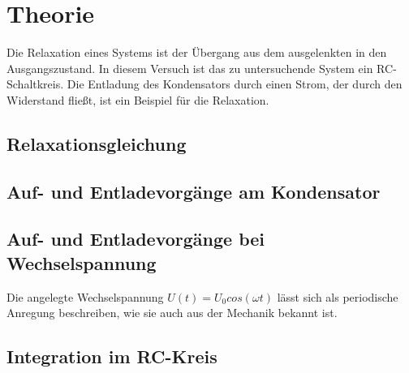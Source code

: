 \section{Theorie}
\label{sec:Theorie}

Die Relaxation eines Systems ist der Übergang aus dem ausgelenkten in den Ausgangszustand.
In diesem Versuch ist das zu untersuchende System ein RC-Schaltkreis.
Die Entladung des Kondensators durch einen Strom, der durch den Widerstand fließt, 
ist ein Beispiel für die Relaxation.

\subsection{Relaxationsgleichung}
\label{subsec:Die Relaxationsgleichung}

\subsection{Auf- und Entladevorgänge am Kondensator}
\label{subsec:Auf- und Entladevorgänge am Kondensator}

\subsection{Auf- und Entladevorgänge bei Wechselspannung}
\label{subsec:Auf- und Entladevorgänge bei Wechselspannung}

Die angelegte Wechselspannung $U(t) = U_0 cos(\omega t)$ lässt sich als periodische Anregung beschreiben, wie sie auch
aus der Mechanik bekannt ist.



\subsection{Integration im RC-Kreis}
\label{subsec:Integration im RC-Kreis}


\cite{sample}
